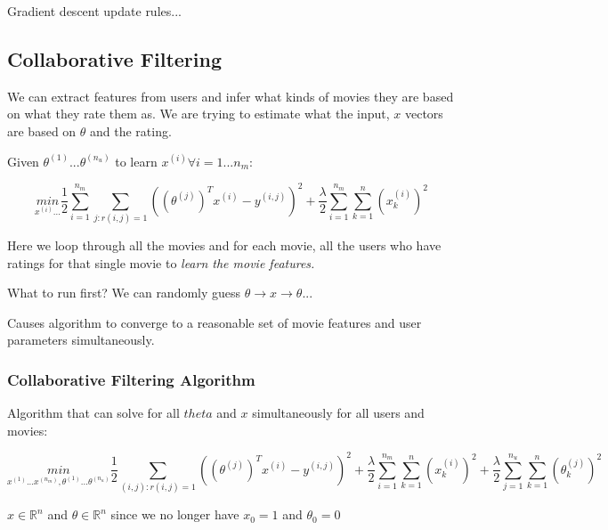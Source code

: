 \documentclass{article}
\begin{document}
Gradient descent update rules...



\subsection{Collaborative Filtering}


We can extract features from users and infer what kinds of movies they are based on what they rate them as. We are trying to estimate what the input, $x$ vectors are based on $\theta$ and the rating.


\begin{mybox}
Given $\theta^{(1)} ... \theta^{(n_u)}$ to learn $x^{(i)} \forall i = 1 ... n_m$:

\begin{equation}
    \underset{x^{(i)} ...}{min} \frac{1}{2} \sum_{i=1}^{n_m}  \sum_{j:r(i,j) =1} ((\theta^{(j)})^T x^{(i)} - y^{(i,j)})^2 + \frac{\lambda}{2} \sum_{i=1}^{n_m}  \sum_{k=1}^n (x_k^{(i)})^2
\end{equation}

Here we loop through all the movies and for each movie, all the users who have ratings for that single movie to \textit{learn the movie features.}
\end{mybox}


What to run first? We can randomly guess $\theta \longrightarrow x \longrightarrow \theta ...$

Causes algorithm to converge to a reasonable set of movie features and user parameters simultaneously.


\subsubsection{Collaborative Filtering Algorithm}

Algorithm that can solve for all $theta$ and $x$ simultaneously for all users and movies:

\begin{equation}
       \underset{x^{(1)} ... x^{(n_m)}, \theta^{(1)} ... \theta^{(n_u)}}{min} \frac{1}{2} \sum_{(i, j) : r(i, j) = 1} \left((\theta^{(j)})^T x^{(i)} - y^{(i,j)}\right)^2 + \frac{\lambda}{2} \sum_{i=1}^{n_m}  \sum_{k=1}^n (x_k^{(i)})^2 + \frac{\lambda}{2} \sum_{j=1}^{n_u} \sum_{k=1}^n (\theta_k^{(j)})^2
\end{equation}

$x \in \mathbb{R}^n$ and $\theta \in \mathbb{R}^n$ since we no longer have $x_0 = 1$ and $\theta_0 = 0$
\end{document}

